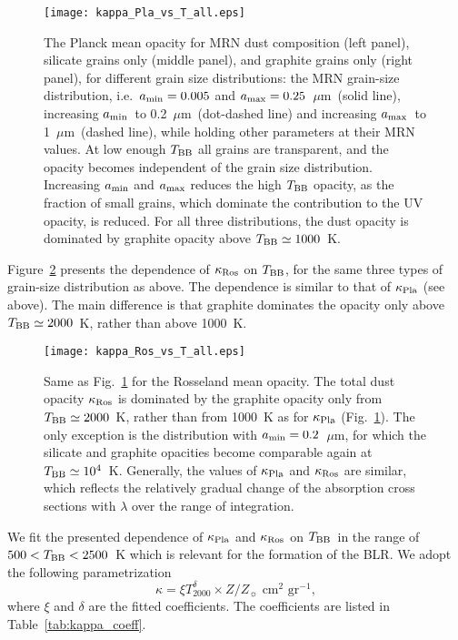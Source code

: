 \documentclass[a4paper,fleqn,usenatbib]{mnras}
\newcommand{\amin}{\mbox{$a_{\rm min}$}}
\newcommand{\amax}{\mbox{$a_{\rm max}$}}
\newcommand{\mic}{\mbox{$\mu$m}}
\newcommand{\Tbb}{\mbox{$T_{\rm BB}$}}
\begin{document}
\begin{figure*}
	\texttt{[image: kappa\_Pla\_vs\_T\_all.eps]}
	\caption{The Planck mean opacity for MRN dust composition (left panel), silicate grains only 
(middle panel), and graphite grains only (right panel), for different grain size distributions: 
the MRN grain-size distribution, i.e.\ $\amin=0.005$ and $\amax=0.25$~\mic\ (solid line), increasing 
\amin\ to 0.2~\mic\ (dot-dashed line) and increasing \amax\ to 1~\mic\ (dashed line), while holding other parameters at their MRN values. At low enough $T_{\rm BB}$ all grains are transparent, and the opacity becomes independent
of the grain size distribution. Increasing $\amin$ and $\amax$ reduces the high $T_{\rm BB}$ opacity, as the
fraction of small grains, which dominate the contribution to the UV opacity, is reduced.
For all three distributions, the dust opacity is dominated by graphite opacity above $T_{\rm BB}\simeq 1000$~K.}
	\label{fig:kappa_Pla_vs_T}
\end{figure*}


Figure~\ref{fig:kappa_Ros_vs_T} presents the dependence of $\kappa_{\rm Ros}$ on \Tbb, for the same three types of grain-size distribution as above. The dependence is similar to that of $\kappa_{\rm Pla}$ (see above). The main difference is that graphite dominates the opacity only above $\Tbb\simeq2000$~K, rather than above 1000~K. 

\begin{figure*}
	\texttt{[image: kappa\_Ros\_vs\_T\_all.eps]}
	\caption{Same as Fig.~\ref{fig:kappa_Pla_vs_T} for the Rosseland mean opacity. The total dust opacity $\kappa_{\rm Ros}$ is dominated by the graphite opacity only from $T_{\rm BB}\simeq2000$~K, rather than from 1000~K as for $\kappa_{\rm Pla}$ (Fig.~\ref{fig:kappa_Pla_vs_T}). The only exception is the distribution with $\amin=0.2$~\mic, for which the silicate and graphite opacities become comparable again at $T_{\rm BB}\simeq 10^4$~K. Generally,
the values of $\kappa_{\rm Pla}$ and $\kappa_{\rm Ros}$ are similar, which reflects the relatively gradual change
of the absorption cross sections with $\lambda$ over the range of integration.}
	\label{fig:kappa_Ros_vs_T}
\end{figure*}


We fit the presented dependence of $\kappa_{\rm Pla}$ and $\kappa_{\rm Ros}$ on \Tbb\ in the range of $500<\Tbb<2500$~K which is relevant for the formation of the BLR. We adopt the following parametrization
\begin{equation}
\kappa=\xi T_{2000}^\delta \times Z/Z_{\sun}\mbox{~cm$^2$~gr$^{-1}$},  \label{eq:kappa_param}
\end{equation}
where $\xi$ and $\delta$ are the fitted coefficients. The coefficients are listed in Table~\ref{tab:kappa_coeff}.
\end{document}
